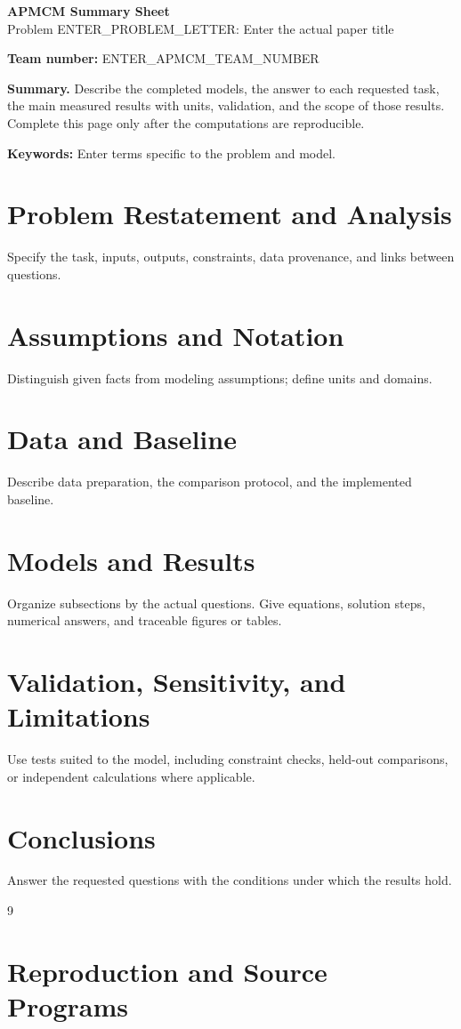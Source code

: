 \documentclass[11pt,a4paper]{article}
\newcommand{\teamnumber}{ENTER\_APMCM\_TEAM\_NUMBER}
\newcommand{\problemletter}{ENTER\_PROBLEM\_LETTER}
\begin{document}
\thispagestyle{fancy}
\begin{center}
  {\Large\bfseries APMCM Summary Sheet}\\[1em]
  {\large Problem \problemletter: Enter the actual paper title}
\end{center}
\noindent\textbf{Team number:} \teamnumber\par\medskip
\noindent\textbf{Summary.} Describe the completed models, the answer to each requested task, the main measured results with units, validation, and the scope of those results. Complete this page only after the computations are reproducible.\par\medskip
\noindent\textbf{Keywords:} Enter terms specific to the problem and model.
\clearpage
\section{Problem Restatement and Analysis}
Specify the task, inputs, outputs, constraints, data provenance, and links between questions.
\section{Assumptions and Notation}
Distinguish given facts from modeling assumptions; define units and domains.
\section{Data and Baseline}
Describe data preparation, the comparison protocol, and the implemented baseline.
\section{Models and Results}
Organize subsections by the actual questions. Give equations, solution steps, numerical answers, and traceable figures or tables.
\section{Validation, Sensitivity, and Limitations}
Use tests suited to the model, including constraint checks, held-out comparisons, or independent calculations where applicable.
\section{Conclusions}
Answer the requested questions with the conditions under which the results hold.
\begin{thebibliography}{9}
\end{thebibliography}
\appendix
\section{Reproduction and Source Programs}
\end{document}
